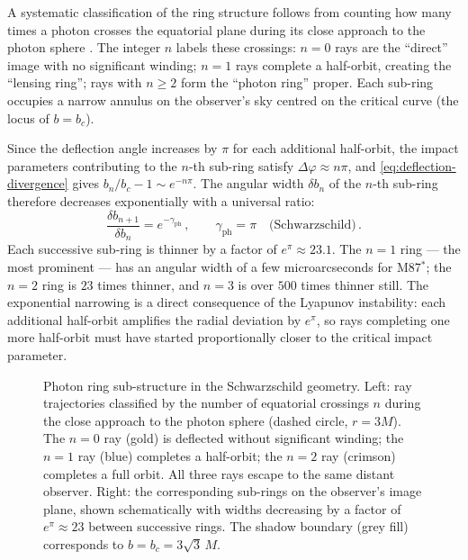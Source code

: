 A systematic classification of the ring structure follows from counting
how many times a photon crosses the equatorial plane during its close
approach to the photon sphere \cite{Johnson2020}.  The integer $n$
labels these crossings: $n = 0$ rays are the ``direct'' image with no
significant winding; $n = 1$ rays complete a half-orbit, creating the
``lensing ring''; rays with $n \geq 2$ form the ``photon ring'' proper.
Each sub-ring occupies a narrow annulus on the observer's sky centred on
the critical curve (the locus of $b = b_c$).

Since the deflection angle increases by $\pi$ for each additional
half-orbit, the impact parameters contributing to the $n$-th sub-ring
satisfy $\Delta\varphi \approx n\pi$, and
\cref{eq:deflection-divergence} gives
$b_n/b_c - 1 \sim e^{-n\pi}$.  The angular width $\delta b_n$ of the
$n$-th sub-ring therefore decreases exponentially with a universal
ratio:
%
\begin{equation}
  \frac{\delta b_{n+1}}{\delta b_n} = e^{-\gamma_{\text{ph}}} \,, \qquad
  \gamma_{\text{ph}} = \pi \quad \text{(Schwarzschild)} \,.
  \label{eq:demagnification}
\end{equation}
%
Each successive sub-ring is thinner by a factor of
$e^\pi \approx 23.1$.  The $n = 1$ ring --- the most prominent --- has
an angular width of a few microarcseconds for M87$^*$; the $n = 2$ ring
is $23$ times thinner, and $n = 3$ is over $500$ times thinner still.
The exponential narrowing is a direct consequence of the Lyapunov
instability: each additional half-orbit amplifies the radial deviation
by $e^\pi$, so rays completing one more half-orbit must have started
proportionally closer to the critical impact parameter.

\begin{figure}[htbp]
  \centering
  \makebox[\textwidth][c]{}
  \caption[Photon ring sub-structure in the Schwarzschild geometry]{%
    Photon ring sub-structure in the Schwarzschild geometry.
    Left: ray trajectories classified by the number of equatorial
    crossings $n$ during the close approach to the photon sphere
    (dashed circle, $r = 3M$).  The $n = 0$ ray (gold) is deflected
    without significant winding; the $n = 1$ ray (blue) completes a
    half-orbit; the $n = 2$ ray (crimson) completes a full orbit.
    All three rays escape to the same distant observer.
    Right: the corresponding sub-rings on the observer's image plane,
    shown schematically with widths decreasing by a factor of
    $e^\pi \approx 23$ between successive rings.  The shadow boundary
    (grey fill) corresponds to $b = b_c = 3\sqrt{3}\,M$.}
  \label{fig:photon-ring-structure}
\end{figure}

